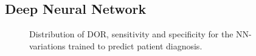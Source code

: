 \newpage

\subsection{Deep Neural Network}

\begin{figure}[H]
    \centering
    
    \caption{Distribution of DOR, sensitivity and specificity for the NN-variations trained to predict patient diagnosis.}
    \label{fig:dl_ind_dor_sens_spec_dist}
\end{figure}

